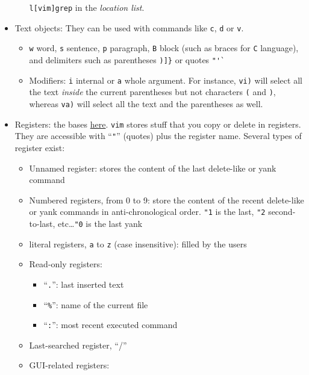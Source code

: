 \documentclass[a4paper,12pt,%
              final%
              ]{article}
\newcommand{\vim}{\texttt{vim}}
\begin{document}
\begin{itemize}
\begin{itemize}
        \texttt{l[vim]grep} in the \emph{location list}.
    \end{itemize}
  \item Text objects: They can be used with commands like \texttt{c}, \texttt{d} or
    \texttt{v}.
    \begin{itemize}
      \item \texttt{w} word, \texttt{s} sentence, \texttt{p} paragraph, \texttt{B}
        block (such as braces for \texttt{C} language), and delimiters such as
        parentheses \verb|)]}| or quotes \verb|"'`|
      \item Modifiers: \texttt{i} internal or \texttt{a} whole argument. For
        instance, \texttt{vi)} will select all the text \emph{inside} the current
        parentheses but not characters \texttt{(} and \texttt{)}, whereas
        \texttt{va)} will select all the text and the parentheses as well.
    \end{itemize}
  \item Registers: the bases \href{https://www.brianstorti.com/vim-registers/}{here}.
    \vim{} stores stuff that you copy or delete in registers. They are accessible
    with ``\texttt{"}'' (quotes) plus the register name. Several types of register
    exist:
    \begin{itemize}
      \item Unnamed register: stores the content of the last delete-like or yank
        command
      \item Numbered registers, from 0 to 9: store the content of the recent
        delete-like or yank commands in anti-chronological order. \texttt{"1} is the
        last, \texttt{"2} second-to-last, etc\ldots \texttt{"0} is the last yank
      \item literal registers, \texttt{a} to \texttt{z} (case insensitive): filled by
        the users
      \item Read-only registers:
        \begin{itemize}
          \item ``\texttt{.}'': last inserted text
          \item ``\verb!%!'': name of the current file
          \item ``\texttt{:}'': most recent executed command
        \end{itemize}
      \item Last-searched register, ``/''
      \item GUI-related registers:
        \begin{itemize}

\end{itemize}
\end{itemize}
\end{itemize}
\end{document}
